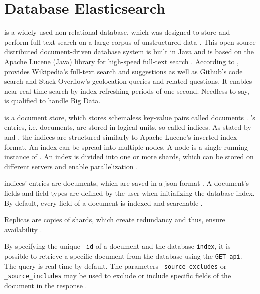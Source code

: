
\section{Database Elasticsearch}\label{subsec:db}

\databaseName{} is a widely used non-relational database, which was designed to store and perform full-text search on a large corpus of unstructured data \cite{Elasticsearch2017}.
This open-source distributed document-driven database system is built in Java and is based on the Apache Lucene (Java) library for high-speed full-text search \cite{Elasticsearch2017, Elasticsearch2019}.
According to \citeauthor{Elasticsearch2019}, \databaseName{} provides Wikipedia's full-text search and suggestions as well as Github's code search and Stack Overflow's geolocation queries and related questions.
It enables near real-time search by index refreshing periods of one second.
Needless to say, \databaseName{} is qualified to handle Big Data.

\databaseName{} is a document store, which stores schemaless key-value pairs called documents \cite{flask2018}.
\databaseName{}'s entries, i.e. documents, are stored in logical units, so-called indices.
As stated by \citeauthor{Elasticsearch2019} and \citeauthor{Elasticsearch2017}, the indices are structured similarly to Apache Lucene's inverted index format.
An index can be spread into multiple nodes.
A node is a single running instance of \databaseName{} \cite{Elasticsearch2019}.
An index is divided into one or more shards, which can be stored on different servers and enable parallelization \cite{Elasticsearch2019}.

\databaseName{} indices' entries are documents, which are saved in a \ac{json} format \cite{Elasticsearch2017}.
A document's fields and field types are defined by the user when initializing the database index.
By default, every field of a document is indexed and searchable \cite{Elasticsearch2019}.

Replicas are copies of shards, which create redundancy and thus, ensure availability \cite{Elasticsearch2019}.

By specifying the unique \texttt{\_id} of a document and the database \texttt{index}, it is possible to retrieve a specific document from the database using the \texttt{GET \ac{api}}.
The query is real-time by default.
The parameters \texttt{\_source\_excludes} or \texttt{\_source\_includes} may be used to exclude or include specific fields of the document in the response \cite{Elasticsearch-get}.

